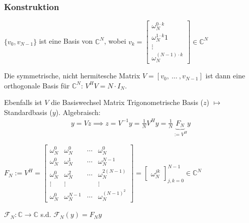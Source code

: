 \subsubsection{Konstruktion}

 $\{v_0, v_{N-1}\}$ ist eine Basis von $\mathbb{C}^N$, wobei $v_k = \begin{bmatrix}
    \omega_N^{0\cdot k} \\ \omega_N^{1\cdot k}1 \\ \vdots \\ \omega_N^{(N-1)\cdot k}
\end{bmatrix} \in \mathbb{C}^N$ 

Die symmetrische, nicht hermitesche Matrix $V = [v_0,\ \ldots\ , v_{N-1}]$ ist dann eine orthogonale Basis für $\mathbb{C}^N$: $V^HV = N\cdot I_N$.

Ebenfalls ist $V$ die Basiswechsel Matrix Trigonometrische Basis ($z$) $\mapsto$ Standardbasis ($y$). Algebraisch:
\begin{align*}
    y = Vz \implies z = V^{-1}y = \frac{1}{N}V^Hy = \frac{1}{N}\underbrace{F_N}_{:= V^H} y
\end{align*}

 $F_N := V^H = \begin{bmatrix}
    \omega_N^0 & \omega_N^0 & \cdots & \omega_N^0 \\
    \omega_N^0 & \omega_N^1 & \cdots & \omega_N^{N-1} \\
    \omega_N^0 & \omega_N^2 & \cdots & \omega_N^{2(N-1)} \\
    \vdots     & \vdots     &        & \vdots \\
    \omega_N^0 & \omega_N^{N-1} &\cdots & \omega_N^{(N-1)^2} 
\end{bmatrix}
= \begin{bmatrix}
    \omega_N^{jk}
\end{bmatrix}^{N-1}_{j,k = 0} \in \mathbb{C}^N
$

 $\mathcal{F}_N: \mathbb{C} \to \mathbb{C}$ s.d. $\mathcal{F}_N(y) = F_Ny$
